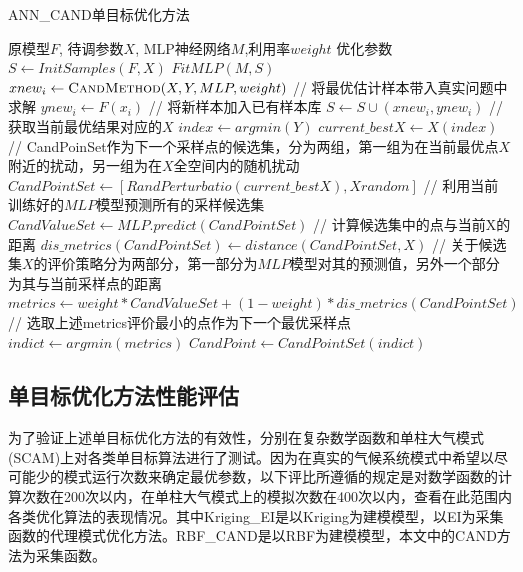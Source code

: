 \renewcommand{\algorithmicrequire}{\textbf{输入:}}
\renewcommand{\algorithmicensure}{\textbf{输出:}}
\begin{algorithm}
        \caption{ANN\_CAND单目标优化方法}
        \begin{algorithmic}[1] %
            \Require 原模型$F$, 待调参数$X$, MLP神经网络$M$,利用率$weight$
            \Ensure 优化参数
            \State $S \gets InitSamples( F, X )$
                \State $FitMLP(M, S)$
                \State $xnew_i \gets \Call {CandMethod}{X,Y,MLP,weight}$
                \State // 将最优估计样本带入真实问题中求解
                \State $ynew_i \gets F(x_i)$
                \State // 将新样本加入已有样本库
                \State $S \gets S \cup (xnew_i,ynew_i)$
            \EndFor
              \State // 获取当前最优结果对应的$X$
              \State $index \gets argmin(Y)$
              \State $current\_bestX \gets X(index)$ 
              \State // CandPoinSet作为下一个采样点的候选集，分为两组，第一组为在当前最优点$X$附近的扰动，另一组为在$X$全空间内的随机扰动
              \State $CandPointSet \gets [RandPerturbatio(current\_bestX),Xrandom]$
              \State // 利用当前训练好的$MLP$模型预测所有的采样候选集
              \State $CandValueSet \gets MLP.predict(CandPointSet)$
              \State // 计算候选集中的点与当前X的距离
              \State $dis\_metrics(CandPointSet) \gets distance(CandPointSet,X)$
              \State // 关于候选集$X$的评价策略分为两部分，第一部分为$MLP$模型对其的预测值，另外一个部分为其与当前采样点的距离
              \State $metrics \gets weight * CandValueSet + (1-weight) * dis\_metrics(CandPointSet)$
              \State  // 选取上述metrics评价最小的点作为下一个最优采样点
              \State $indict \gets argmin(metrics)$
              \State $CandPoint \gets CandPointSet(indict)$
            \EndFunction
        \end{algorithmic}
\end{algorithm}



\subsection{单目标优化方法性能评估}
 为了验证上述单目标优化方法的有效性，分别在复杂数学函数和单柱大气模式(SCAM)上对各类单目标算法进行了测试。因为在真实的气候系统模式中希望以尽可能少的模式运行次数来确定最优参数，以下评比所遵循的规定是对数学函数的计算次数在200次以内，在单柱大气模式上的模拟次数在400次以内，查看在此范围内各类优化算法的表现情况。其中Kriging\_EI是以Kriging为建模模型，以EI为采集函数的代理模式优化方法。RBF\_CAND是以RBF为建模模型，本文中的CAND方法为采集函数。
 
